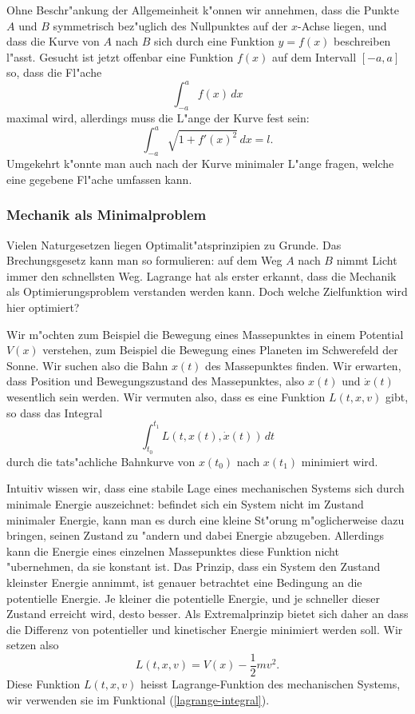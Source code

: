 Ohne Beschr"ankung der Allgemeinheit k"onnen wir annehmen, dass die
Punkte $A$ und $B$ symmetrisch bez"uglich des Nullpunktes auf der
$x$-Achse liegen, und dass die Kurve von $A$ nach $B$ sich durch eine
Funktion $y=f(x)$ beschreiben l"asst. Gesucht ist jetzt offenbar eine
Funktion $f(x)$ auf dem Intervall $[-a,a]$ so, dass die Fl"ache
\[
\int_{-a}^af(x)\,dx
\]
maximal wird, allerdings muss die L"ange der Kurve fest sein:
\[
\int_{-a}^{a} \sqrt{1+f'(x)^2}\,dx=l.
\]
Umgekehrt k"onnte man auch nach der Kurve minimaler L"ange
fragen, welche eine gegebene Fl"ache umfassen kann.

\subsubsection{Mechanik als Minimalproblem}
Vielen Naturgesetzen liegen Optimalit"atsprinzipien zu Grunde.
Das Brechungsgesetz kann man so formulieren: auf dem Weg $A$ 
nach $B$ nimmt Licht immer den schnellsten Weg.
Lagrange hat als erster erkannt, dass die Mechanik als Optimierungsproblem
verstanden werden kann. Doch welche Zielfunktion wird hier optimiert?

Wir m"ochten zum Beispiel die Bewegung eines Massepunktes in einem
Potential $V(x)$ verstehen, zum Beispiel die Bewegung eines Planeten
im Schwerefeld der Sonne.
Wir suchen also die Bahn $x(t)$ des Massepunktes finden. 
Wir erwarten, dass Position und Bewegungszustand des Massepunktes,
also $x(t)$ und $\dot x(t)$ wesentlich sein werden.
Wir vermuten also, dass es eine Funktion $L(t,x,v)$ gibt,
so dass das Integral
\begin{equation}
\int_{t_0}^{t_1} L(t, x(t), \dot x(t))\,dt
\label{lagrange-integral}
\end{equation}
durch die tats"achliche Bahnkurve von $x(t_0)$ nach $x(t_1)$
minimiert wird.

Intuitiv wissen wir, dass eine stabile Lage eines mechanischen Systems
sich durch minimale Energie auszeichnet: befindet sich ein System nicht
im Zustand minimaler Energie, kann man es durch eine kleine 
St"orung m"oglicherweise dazu bringen, seinen Zustand zu "andern
und dabei Energie abzugeben. Allerdings kann die Energie eines
einzelnen Massepunktes diese Funktion nicht "ubernehmen, da sie
konstant ist. Das Prinzip, dass ein System den Zustand kleinster
Energie annimmt, ist genauer betrachtet eine Bedingung an die potentielle
Energie. Je kleiner die potentielle Energie, und je schneller dieser
Zustand erreicht wird, desto besser. Als Extremalprinzip bietet
sich daher an dass die Differenz von potentieller und kinetischer
Energie minimiert werden soll. Wir setzen also
\begin{equation}
L(t,x,v)=V(x)-\frac12mv^2.
\label{lagrange-funktion}
\end{equation}
Diese Funktion $L(t,x,v)$ heisst Lagrange-Funktion des mechanischen
Systems, wir
verwenden sie im Funktional (\ref{lagrange-integral}).

